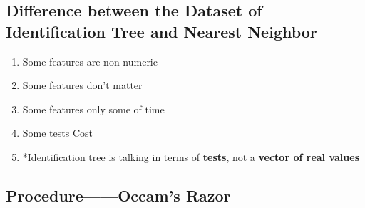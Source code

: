 \documentclass[12pt]{book}
\begin{document}
\subsection{Difference between the Dataset of Identification Tree and Nearest Neighbor}
\begin{enumerate}
	\item Some features are non-numeric
	\item Some features don't matter
	\item Some features only some of time
	\item Some tests Cost
	\item *Identification tree is talking in terms of \textbf{tests}, not a \textbf{vector of real values}
\end{enumerate}
\subsection{Procedure——Occam's Razor}
\end{document}
